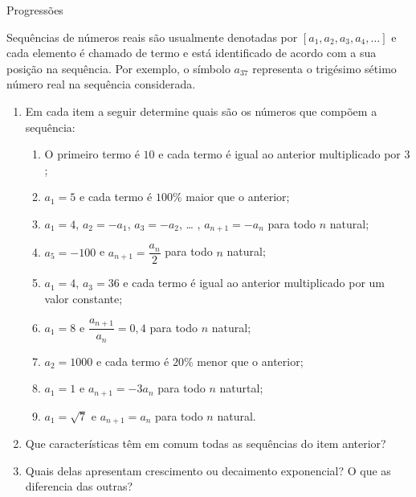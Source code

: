 \begin{task}{Progressões}

Sequências de números reais são usualmente denotadas por $[a_{1}, a_{2}, a_{3}, a_{4}, ... ]$ e cada elemento é chamado de termo e está identificado de acordo com a sua posição na sequência. Por exemplo, o símbolo $a_{37}$ representa o trigésimo sétimo número real na sequência considerada.

\begin{enumerate}

\item{}
Em cada item a seguir determine quais são os números que compõem a sequência:

\begin{enumerate}
\item O primeiro termo é $10$ e cada termo é igual ao anterior multiplicado por $3$;

\item $a_{1}=5$ e cada termo é $100\%$ maior que o anterior;

\item  $a_{1}=4$, $a_{2}= -a_{1}$, $a_{3}= -a_{2}$, … , $a_{n+1}= -a_{n}$ para todo $n$ natural;

\item  $a_{5}=-100$ e $a_{n+1}=\dfrac{a_{n}}{2}$ para todo $n$ natural;

\item  $a_{1}=4$, $a_{3}=36$ e cada termo é igual ao anterior multiplicado por um valor constante;

\item  $a_{1}=8$ e $\dfrac{a_{n+1}}{a_{n}}=0,4$ para todo $n$ natural; 

\item  $a_{2}=1000$ e cada termo é $20\%$ menor que o anterior; 

\item  $a_{1}=1$ e $a_{n+1}=-3a_{n}$ para todo $n$ naturtal;

\item  $a_{1}=\sqrt{7}$ e $a_{n+1}=a_{n}$ para todo $n$ natural.
\end{enumerate}

\item{}
Que características têm em comum todas as sequências do item anterior?

\item{}
Quais delas apresentam crescimento ou decaimento exponencial? O que as diferencia das outras?

\end{enumerate}

\end{task}


